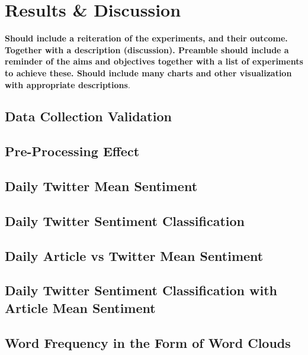 \chapter{Results \& Discussion}
\textbf{Should include a reiteration of the experiments, and their outcome.  Together with a description (discussion).  Preamble should include a reminder of the aims and objectives together with a list of experiments to achieve these.  Should include many charts and other visualization with appropriate descriptions}.  

\section{Data Collection Validation}


\section{Pre-Processing Effect}


\section{Daily Twitter Mean Sentiment}


\section{Daily Twitter Sentiment Classification}


\section{Daily Article vs Twitter Mean Sentiment}


\section{Daily Twitter Sentiment Classification with Article Mean Sentiment}


\section{Word Frequency in the Form of Word Clouds}

